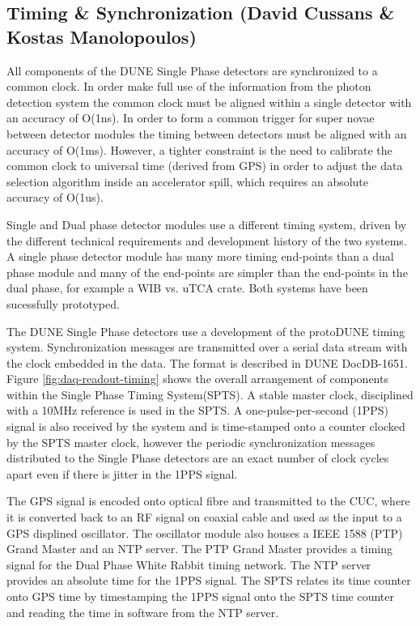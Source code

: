 \subsection{Timing \& Synchronization (David Cussans \& Kostas Manolopoulos)}
\label{sec:fdsp-daq-timing}


All components of the DUNE Single Phase detectors are synchronized to
a common clock. In order make full use of the information from the
photon detection system the common clock must be aligned within a
single detector with an accuracy of O(1ns). In order to form a common
trigger for super novae between detector modules the timing between
detectors must be aligned with an accuracy of O(1ms). However, a
tighter constraint is the need to calibrate the common clock to
universal time (derived from GPS) in order to adjust the data
selection algorithm inside an accelerator spill, which requires an
absolute accuracy of O(1us).

Single and Dual phase detector modules use a different timing system,
driven by the different technical requirements and development history
of the two systems. A single phase detector module has many more
timing end-points than a dual phase module and many of the end-points
are simpler than the end-points in the dual phase, for example a WIB
vs. uTCA crate. Both systems have been sucessfully prototyped.

The DUNE Single Phase detectors use a development of the protoDUNE
timing system. Synchronization messages are transmitted over a serial
data stream with the clock embedded in the data. The format is
described in DUNE DocDB-1651. Figure \ref{fig:daq-readout-timing}
shows the overall arrangement of components within the Single Phase
Timing System(SPTS). A stable master clock, disciplined with a 10MHz
reference is used in the SPTS. A one-pulse-per-second (1PPS) signal is
also received by the system and is time-stamped onto a counter clocked
by the SPTS master clock, however the periodic synchronization
messages distributed to the Single Phase detectors are an exact number
of clock cycles apart even if there is jitter in the 1PPS signal.

The GPS signal is encoded onto optical fibre and transmitted to the
CUC, where it is converted back to an RF signal on coaxial cable and
used as the input to a GPS displined oscillator. The oscillator module
also houses a IEEE 1588 (PTP) Grand Master and an NTP server. The PTP
Grand Master provides a timing signal for the Dual Phase White Rabbit
timing network. The NTP server provides an absolute time for the 1PPS
signal. The SPTS relates its time counter onto GPS time by
timestamping the 1PPS signal onto the SPTS time counter and reading
the time in software from the NTP server.

